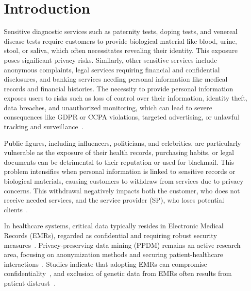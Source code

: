 \documentclass[pdftex,twocolumn,epjc3]{svjour3}
\begin{document}
\section{Introduction}
\label{sec:introduction}
\begin{sloppypar}
Sensitive diagnostic services such as paternity tests, doping tests, and venereal disease tests require customers to provide biological material like blood, urine, stool, or saliva, which often necessitates revealing their identity. This exposure poses significant privacy risks. Similarly, other sensitive services include anonymous complaints, legal services requiring financial and confidential disclosures, and banking services needing personal information like medical records and financial histories. The necessity to provide personal information exposes users to risks such as loss of control over their information, identity theft, data breaches, and unauthorized monitoring, which can lead to severe consequences like GDPR or CCPA violations, targeted advertising, or unlawful tracking and surveillance~\cite{smithInformationPrivacyResearch2011}.
\end{sloppypar}

\begin{sloppypar}
Public figures, including influencers, politicians, and celebrities, are particularly vulnerable as the exposure of their health records, purchasing habits, or legal documents can be detrimental to their reputation or used for blackmail. This problem intensifies when personal information is linked to sensitive records or biological materials, causing customers to withdraw from services due to privacy concerns. This withdrawal negatively impacts both the customer, who does not receive needed services, and the service provider (SP), who loses potential clients~\cite{klitzmanExclusionGeneticInformation2010,blackPresymptomaticTestingConfidentiality2021}.
\end{sloppypar}

\begin{sloppypar}
In healthcare systems, critical data typically resides in Electronic Medical Records (EMRs), regarded as confidential and requiring robust security measures~\cite{jinReviewSecurePrivacypreserving2019,keshtaSecurityPrivacyElectronic2021}. Privacy-preserving data mining (PPDM) remains an active research area, focusing on anonymization methods and securing patient-healthcare interactions~\cite{nareshPrivacyPreservingData2023,linPPSFOpensourcePrivacypreserving2018,hewagePrivacypreservingDataStream2023}. Studies indicate that adopting EMRs can compromise confidentiality~\cite{blackPresymptomaticTestingConfidentiality2021}, and exclusion of genetic data from EMRs often results from patient distrust~\cite{klitzmanExclusionGeneticInformation2010}.
\end{sloppypar}
\end{document}
